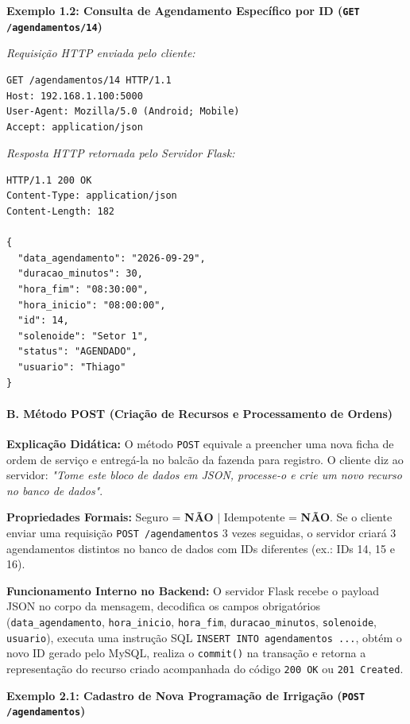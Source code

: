 \textbf{Exemplo 1.2: Consulta de Agendamento Específico por ID (\texttt{GET /agendamentos/14})}

\textit{Requisição HTTP enviada pelo cliente:}
\begin{lstlisting}
GET /agendamentos/14 HTTP/1.1
Host: 192.168.1.100:5000
User-Agent: Mozilla/5.0 (Android; Mobile)
Accept: application/json

\end{lstlisting}

\textit{Resposta HTTP retornada pelo Servidor Flask:}
\begin{lstlisting}
HTTP/1.1 200 OK
Content-Type: application/json
Content-Length: 182

{
  "data_agendamento": "2026-09-29",
  "duracao_minutos": 30,
  "hora_fim": "08:30:00",
  "hora_inicio": "08:00:00",
  "id": 14,
  "solenoide": "Setor 1",
  "status": "AGENDADO",
  "usuario": "Thiago"
}
\end{lstlisting}

\paragraph*{B. Método POST (Criação de Recursos e Processamento de Ordens)}

\textbf{Explicação Didática:} O método \texttt{POST} equivale a preencher uma nova ficha de ordem de serviço e entregá-la no balcão da fazenda para registro. O cliente diz ao servidor: \textit{"Tome este bloco de dados em JSON, processe-o e crie um novo recurso no banco de dados"}.

\textbf{Propriedades Formais:} Seguro = \textbf{NÃO} $|$ Idempotente = \textbf{NÃO}. Se o cliente enviar uma requisição \texttt{POST /agendamentos} 3 vezes seguidas, o servidor criará 3 agendamentos distintos no banco de dados com IDs diferentes (ex.: IDs 14, 15 e 16).

\textbf{Funcionamento Interno no Backend:} O servidor Flask recebe o payload JSON no corpo da mensagem, decodifica os campos obrigatórios (\texttt{data\_agendamento}, \texttt{hora\_inicio}, \texttt{hora\_fim}, \texttt{duracao\_minutos}, \texttt{solenoide}, \texttt{usuario}), executa uma instrução SQL \texttt{INSERT INTO agendamentos ...}, obtém o novo ID gerado pelo MySQL, realiza o \texttt{commit()} na transação e retorna a representação do recurso criado acompanhada do código \texttt{200 OK} ou \texttt{201 Created}.

\textbf{Exemplo 2.1: Cadastro de Nova Programação de Irrigação (\texttt{POST /agendamentos})}

